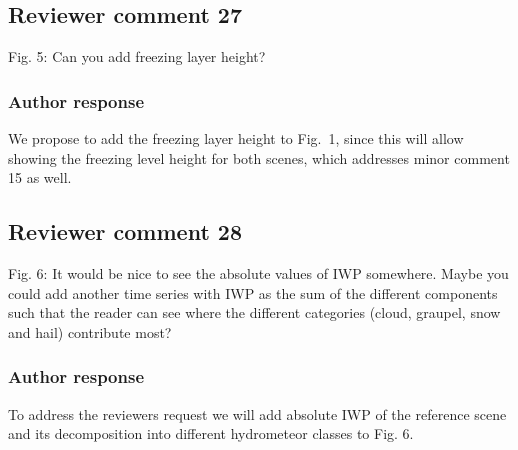 \documentclass[11pt]{scrartcl}
\begin{document}
\subsection*{Reviewer comment 27}
Fig. 5: Can you add freezing layer height?

\subsubsection*{Author response}

We propose to add the freezing layer height to Fig.~1, since this will
allow showing the freezing level height for both scenes, which 
addresses minor comment 15 as well.

%


\subsection*{Reviewer comment 28}
Fig.  6:  It would be nice to see the absolute values of IWP somewhere.  Maybe you could add another time series with IWP as the sum of the different components such that the reader can see where the different categories (cloud, graupel, snow and hail) contribute most?

\subsubsection*{Author response}

To address the reviewers request we will add absolute IWP of the reference scene
and its decomposition into different hydrometeor classes to Fig. 6.

%
\end{document}
